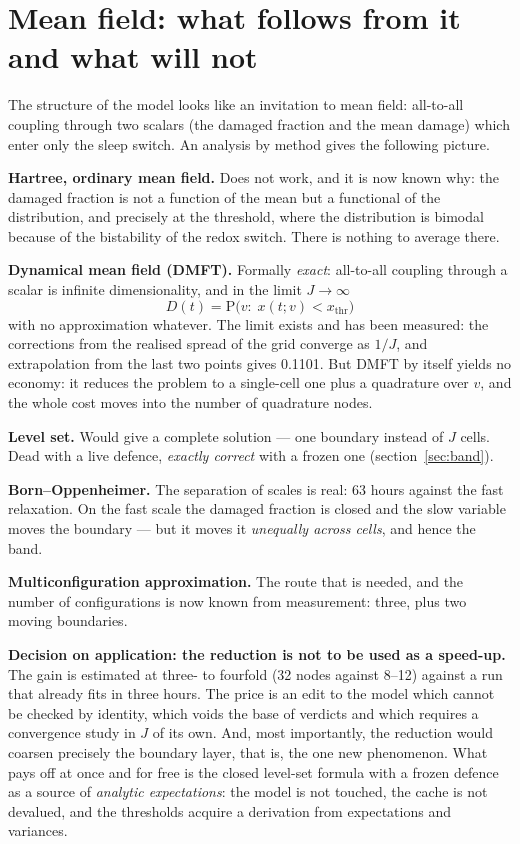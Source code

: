 \section{Mean field: what follows from it and what will not}\label{sec:mf}
The structure of the model looks like an invitation to mean field: all-to-all coupling through two scalars (the damaged fraction and the mean damage) which enter only the sleep switch. An analysis by method gives the following picture.

\textbf{Hartree, ordinary mean field.} Does not work, and it is now known why: the damaged fraction is not a function of the mean but a functional of the distribution, and precisely at the threshold, where the distribution is bimodal because of the bistability of the redox switch. There is nothing to average there.

\textbf{Dynamical mean field (DMFT).} Formally \emph{exact}: all-to-all coupling through a scalar is infinite dimensionality, and in the limit $J\to\infty$
\[D(t)=\mathrm{P}\big(v:\;x(t;v)<x_{\text{thr}}\big)\]
with no approximation whatever. The limit exists and has been measured: the corrections from the realised spread of the grid converge as $1/J$, and extrapolation from the last two points gives 0.1101. But DMFT by itself yields no economy: it reduces the problem to a single-cell one plus a quadrature over $v$, and the whole cost moves into the number of quadrature nodes.

\textbf{Level set.} Would give a complete solution --- one boundary instead of $J$ cells. Dead with a live defence, \emph{exactly correct} with a frozen one (section~\ref{sec:band}).

\textbf{Born--Oppenheimer.} The separation of scales is real: 63 hours against the fast relaxation. On the fast scale the damaged fraction is closed and the slow variable moves the boundary --- but it moves it \emph{unequally across cells}, and hence the band.

\textbf{Multiconfiguration approximation.} The route that is needed, and the number of configurations is now known from measurement: three, plus two moving boundaries.

\begin{note}
\textbf{Decision on application: the reduction is not to be used as a speed-up.} The gain is estimated at three- to fourfold (32 nodes against 8--12) against a run that already fits in three hours. The price is an edit to the model which cannot be checked by identity, which voids the base of verdicts and which requires a convergence study in $J$ of its own. And, most importantly, the reduction would coarsen precisely the boundary layer, that is, the one new phenomenon. What pays off at once and for free is the closed level-set formula with a frozen defence as a source of \emph{analytic expectations}: the model is not touched, the cache is not devalued, and the thresholds acquire a derivation from expectations and variances.
\end{note}
